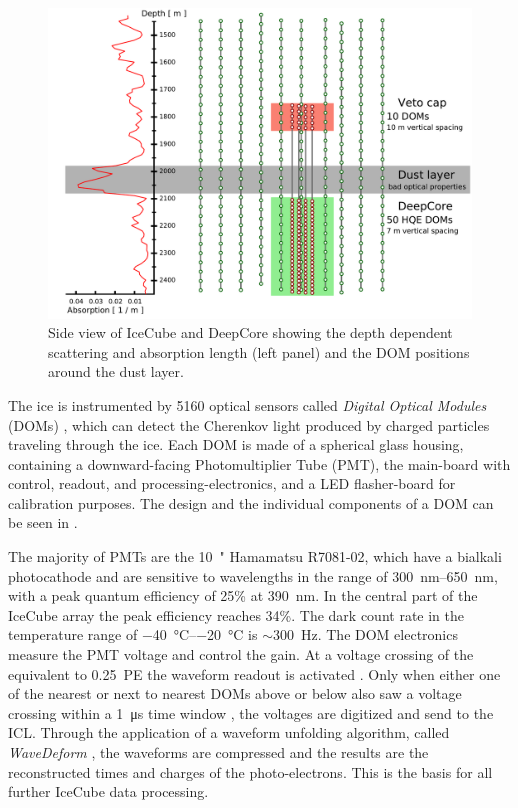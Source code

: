 \begin{figure}[h]
    \includegraphics{figures/icecube_deepcore/DeepCore_sideview.pdf}
	\caption[IceCube sideview]{Side view of IceCube and DeepCore showing the depth dependent scattering and absorption length (left panel) and the DOM positions around the dust layer.}
\end{figure}



The ice is instrumented by 5160 optical sensors called \textit{Digital Optical Modules} (DOMs) , which can detect the Cherenkov light produced by charged particles traveling through the ice. Each DOM is made of a spherical glass housing, containing a downward-facing Photomultiplier Tube (PMT), the main-board with control, readout, and processing-electronics, and a LED flasher-board for calibration purposes. The design and the individual components of a DOM can be seen in .

The majority of PMTs are the \SI{10}{"} Hamamatsu R7081-02, which have a bialkali photocathode and are sensitive to wavelengths in the range of \SIrange{300}{650}{\nano\metre}, with a peak quantum efficiency of 25\% at \SI{390}{\nano\metre}. In the central part of the IceCube array the peak efficiency reaches 34\%. The dark count rate in the temperature range of \SIrange{-40}{-20}{\degreeCelsius} is $\sim$\SI{300}{\hertz}. The DOM electronics measure the PMT voltage and control the gain. At a voltage crossing of the equivalent to \SI{0.25}{PE} the waveform readout is activated . Only when either one of the nearest or next to nearest DOMs above or below also saw a voltage crossing within a \SI{1}{\micro\second} time window , the voltages are digitized and send to the ICL. Through the application of a waveform unfolding algorithm, called \textit{WaveDeform} , the waveforms are compressed and the results are the reconstructed times and charges of the photo-electrons. This is the basis for all further IceCube data processing.

